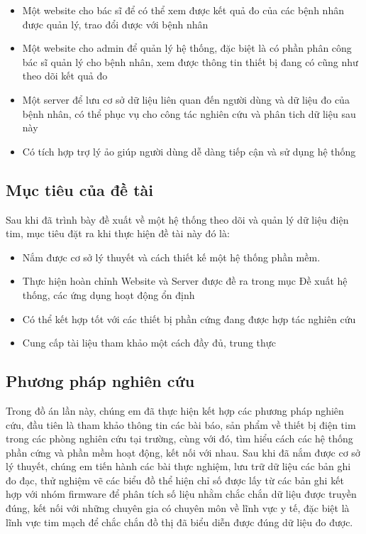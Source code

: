 \begin{adjustwidth}{1.5em}{}
  \begin{itemize}
     
      \item Một website cho bác sĩ để có thể xem được kết quả đo của các bệnh nhân được quản lý, trao đổi được với bệnh nhân
      \item Một website cho admin để quản lý hệ thống, đặc biệt là có phần phân công bác sĩ quản lý cho bệnh nhân, xem được thông tin thiết bị đang có cũng như theo dõi kết quả đo
      \item Một server để lưu cơ sở dữ liệu liên quan đến người dùng và dữ liệu đo của bệnh nhân, có thể phục vụ cho công tác nghiên cứu và
      phân tich dữ liệu sau này
      \item Có tích hợp trợ lý ảo giúp người dùng dễ dàng tiếp cận và sử dụng hệ thống
  \end{itemize}
  \end{adjustwidth}


\subsection*{Mục tiêu của đề tài}
Sau khi đã trình bày đề xuất về một hệ thống theo dõi và quản lý dữ liệu điện tim, mục tiêu đặt ra khi thực hiện
đề tài này đó là:

\begin{adjustwidth}{1.5em}{}
  \begin{itemize}
      \item Nắm được cơ sở lý thuyết và cách thiết kế một hệ thống phần mềm.
      \item Thực hiện hoàn chỉnh Website và Server được đề ra trong mục Đề xuất hệ thống, các ứng dụng hoạt động ổn định
      \item Có thể kết hợp tốt với các thiết bị phần cứng đang được hợp tác nghiên cứu
      \item Cung cấp tài liệu tham khảo một cách đầy đủ, trung thực

  \end{itemize}
  \end{adjustwidth}





\subsection*{Phương pháp nghiên cứu}
Trong đồ án lần này, chúng em đã thực hiện kết hợp các phương pháp nghiên cứu, đầu tiên là tham khảo thông tin các bài
báo, sản phẩm về thiết bị điện tim trong các phòng nghiên cứu tại trường, cùng với đó, tìm hiểu cách các hệ thống phần cứng và phần mềm hoạt động,
kết nối với nhau. Sau khi đã nắm được cơ sở lý thuyết, chúng em tiến hành các bài thực nghiệm, lưu trữ dữ liệu các bản ghi đo đạc, thử nghiệm vẽ các biểu đồ thể hiện chỉ số được lấy từ các bản ghi
kết hợp với nhóm firmware để phân tích số liệu nhằm chắc chắn dữ liệu được truyền đúng, kết nối với những chuyên gia có chuyên môn về lĩnh vực y tế, đặc biệt là lĩnh vực tim mạch để chắc chắn đồ thị đã biểu diễn được đúng dữ liệu đo được.

